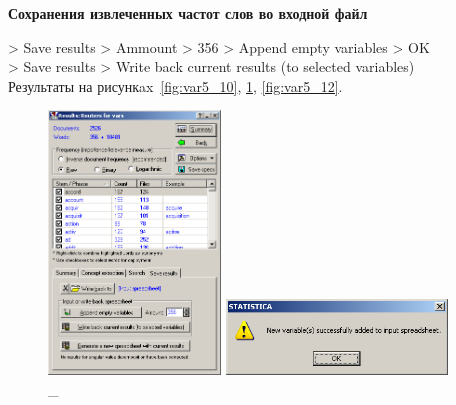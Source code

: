 \begin{center}
  \textbf{Сохранения извлеченных частот слов во входной файл}
\end{center}

> Save results > Ammount > 356 > Append empty variables > OK \\
> Save results > Write back current results (to selected variables) \\

Результаты на рисункax~\ref{fig:var5_10}, \ref{fig:var5_11}, \ref{fig:var5_12}.

\begin{figure}[!h]
  \centering

  \begin{minipage}{0.49\textwidth}
    \centering

    \includegraphics[height=7cm]
    {inc/var5/10.PNG}

    \caption{\_}

    \label{fig:var5_10}
  \end{minipage}
  \begin{minipage}{0.49\textwidth}
    \centering

    \includegraphics[height=2cm]
    {inc/var5/11.PNG}

    \caption{\_}

    \label{fig:var5_11}
  \end{minipage}
\end{figure}


